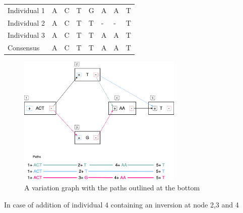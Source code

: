 \documentclass[10pt, a4paper]{article}
\begin{document}
\begin{center}
\begin{tabular}{llllllll}
\color{mypink}Individual 1 & \color{mypink} A & \color{mypink} C & \color{mypink} T & \color{mypink} G & \color{mypink} A & \color{mypink} A & \color{mypink} T\\
\color{myblue}Individual 2 & \color{myblue} A & \color{myblue} C & \color{myblue} T & \color{myblue} T & \color{myblue} - & \color{myblue} - & \color{myblue} T\\
\color{mygreen}Individual 3 & \color{mygreen} A & \color{mygreen} C & \color{mygreen} T & \color{mygreen} T & \color{mygreen} A & \color{mygreen} A & \color{mygreen} T\\
\hline
\color{red}Consensus & \color{red} A & \color{red} C & \color{red} T & \color{red} T & \color{red} A & \color{myred} A & \color{red} T\\
\end{tabular}

\end{center}


\begin{figure}[h!]
\centering
\includegraphics[width=0.7\textwidth]{./figures/Variation-Graph-Page-1.png}
\caption[Variation Graph]{\label{fig:orgade5fbb}A variation graph with the paths outlined at the bottom}
\end{figure}


In case of addition of individual 4 containing an inversion at node 2,3 and 4
\end{document}
